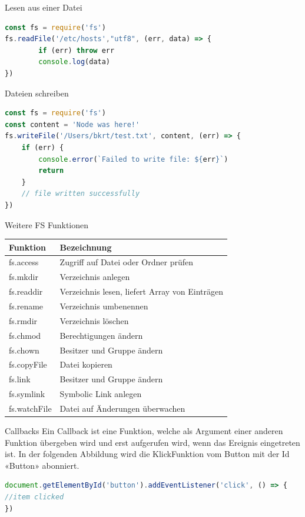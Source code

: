 \begin{code}{Lesen aus einer Datei}
\begin{lstlisting}[language=JavaScript, style=base]
const fs = require('fs')
fs.readFile('/etc/hosts',"utf8", (err, data) => {
        if (err) throw err
        console.log(data)
})
\end{lstlisting}
\end{code}

\begin{code}{Dateien schreiben}
\begin{lstlisting}[language=JavaScript, style=base]
const fs = require('fs')
const content = 'Node was here!'
fs.writeFile('/Users/bkrt/test.txt', content, (err) => {
    if (err) {
        console.error(`Failed to write file: ${err}`)
        return
    }
    // file written successfully
})
\end{lstlisting}
\end{code}

\begin{KR}{Weitere FS Funktionen}
\begin{center}
\begin{tabular}{|l|l|}
\hline
Funktion & Bezeichnung \\
\hline
fs.access & Zugriff auf Datei oder Ordner prüfen \\
\hline
fs.mkdir & Verzeichnis anlegen \\
\hline
fs.readdir & Verzeichnis lesen, liefert Array von Einträgen \\
\hline
fs.rename & Verzeichnis umbenennen \\
\hline
fs.rmdir & Verzeichnis löschen \\
\hline
fs.chmod & Berechtigungen ändern \\
\hline
fs.chown & Besitzer und Gruppe ändern \\
\hline
fs.copyFile & Datei kopieren \\
\hline
fs.link & Besitzer und Gruppe ändern \\
\hline
fs.symlink & Symbolic Link anlegen \\
\hline
fs.watchFile & Datei auf Änderungen überwachen \\
\hline
\end{tabular}
\end{center}
\end{KR}

\begin{definition}{Callbacks}
Ein Callback ist eine Funktion, welche als Argument einer anderen Funktion übergeben wird und erst aufgerufen wird, wenn das Ereignis eingetreten ist. 
In der folgenden Abbildung wird die KlickFunktion vom Button mit der Id «Button» abonniert.
\begin{lstlisting}[language=JavaScript, style=base]
document.getElementById('button').addEventListener('click', () => {
//item clicked
})
\end{lstlisting}
\end{definition}


